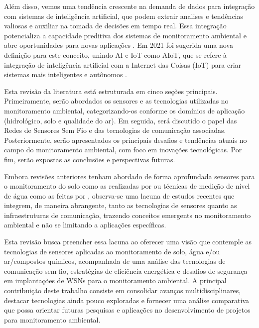 Além disso, vemos uma tendência crescente na demanda de dados para integração com sistemas de inteligência artificial, que podem extrair analises e tendências valiosas e auxiliar na tomada de decisões em tempo real. Essa integração potencializa a capacidade preditiva dos sistemas de monitoramento ambiental e abre oportunidades para novas aplicações \cite{nr_2025_ai,mukhopadhyay_2021_artificial,ferreira_2023_conception,chen_2013_natural, lin_2020_semantic}. Em 2021 foi sugerida uma nova definição para este conceito, unindo AI e IoT como AIoT, que se refere à integração de inteligência artificial com a Internet das Coisas (IoT) para criar sistemas mais inteligentes e autônomos \cite{mukhopadhyay_2021_artificial}.

Esta revisão da literatura está estruturada em cinco seções principais. Primeiramente, serão abordados os sensores e as tecnologias utilizadas no monitoramento ambiental, categorizando-os conforme os domínios de aplicação (hidrológico, solo e qualidade do ar). Em seguida, será discutido o papel das Redes de Sensores Sem Fio e das tecnologias de comunicação associadas. Posteriormente, serão apresentados os principais desafios e tendências atuais no campo do monitoramento ambiental, com foco em inovações tecnológicas. Por fim, serão expostas as conclusões e perspectivas futuras.

Embora revisões anteriores tenham abordado de forma aprofundada sensores para o monitoramento do solo como as realizadas por \textcite{yin_2021_smart, teng_2014_soil, queiroz_2020_sensors} ou técnicas de medição de nível de água como as feitas por \textcite{mohindru_2023_development, nr_2025_ai, wu_2023_a}, observa-se uma lacuna de estudos recentes que integrem, de maneira abrangente, tanto as tecnologias de sensores quanto as infraestruturas de comunicação, trazendo conceitos emergents no monitoramento ambiental e não se limitando a aplicações específicas.

Esta revisão busca preencher essa lacuna ao oferecer uma visão que contemple as tecnologias de sensores aplicadas ao monitoramento de solo, água e/ou ar/compostos químicos, acompanhada de uma análise das tecnologias de comunicação sem fio, estratégias de eficiência energética e desafios de segurança em implantações de WSNs para o monitoramento ambiental. A principal contribuição deste trabalho consiste em consolidar avanços multidisciplinares, destacar tecnologias ainda pouco exploradas e fornecer uma análise comparativa que possa orientar futuras pesquisas e aplicações no desenvolvimento de projetos para monitoramento ambiental.
